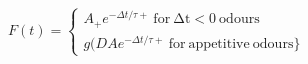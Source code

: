  $F(t) =  \begin{cases} A_{+} e^{−\Delta t/τ+}\:\mathrm{for\:\Delta t <0\:odours}\\g(DA e^{−\Delta t/τ+}\:\mathrm{for\:appetitive\:odours}\} \end{cases}$
 